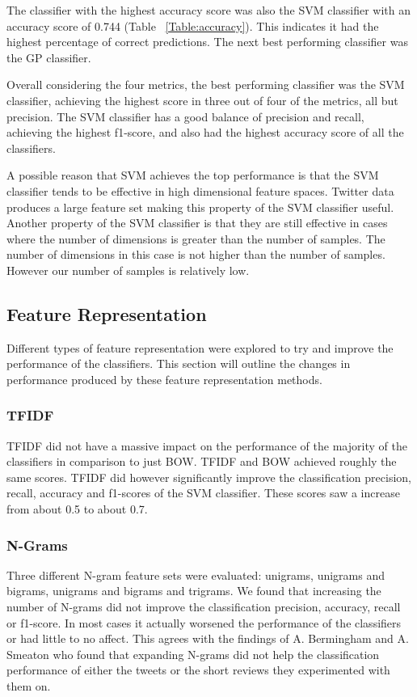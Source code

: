 The classifier with the highest accuracy score was also the SVM classifier with an accuracy score of 0.744 (Table ~\ref{Table:accuracy}). This indicates it had the highest percentage of correct predictions. The next best performing classifier was the GP classifier.

Overall considering the four metrics, the best performing classifier was the SVM classifier, achieving the highest score in three out of four of the metrics, all but precision. The SVM classifier has a good balance of precision and recall, achieving the highest f1-score, and also had the highest accuracy score of all the classifiers.

A possible reason that SVM achieves the top performance is that the SVM classifier tends to be effective in high dimensional feature spaces. Twitter data produces a large feature set making this property of the SVM classifier useful. Another property of the SVM classifier is that they are still effective in cases where the number of dimensions is greater than the number of samples. The number of dimensions in this case is not higher than the number of samples. However our number of samples is relatively low.

\subsection*{Feature Representation}

Different types of feature representation were explored to try and improve the performance of the classifiers. This section will outline the changes in performance produced by these feature representation methods. 

\subsubsection*{TFIDF}
TFIDF did not have a massive impact on the performance of the majority of the classifiers in comparison to just BOW. TFIDF and BOW achieved roughly the same scores. TFIDF did however significantly improve the classification precision, recall, accuracy and f1-scores of the SVM classifier. These scores saw a increase from about 0.5 to about 0.7.

\subsubsection*{N-Grams}
Three different N-gram feature sets were evaluated: unigrams, unigrams and bigrams, unigrams and bigrams and trigrams. We found that increasing the number of N-grams did not improve the classification precision, accuracy, recall or f1-score. In most cases it actually worsened the performance of the classifiers or had little to no affect. This agrees with the findings of A. Bermingham and A. Smeaton \cite{Berm2010} who found that expanding N-grams did not help the classification performance of either the tweets or the short reviews they experimented with them on. 

